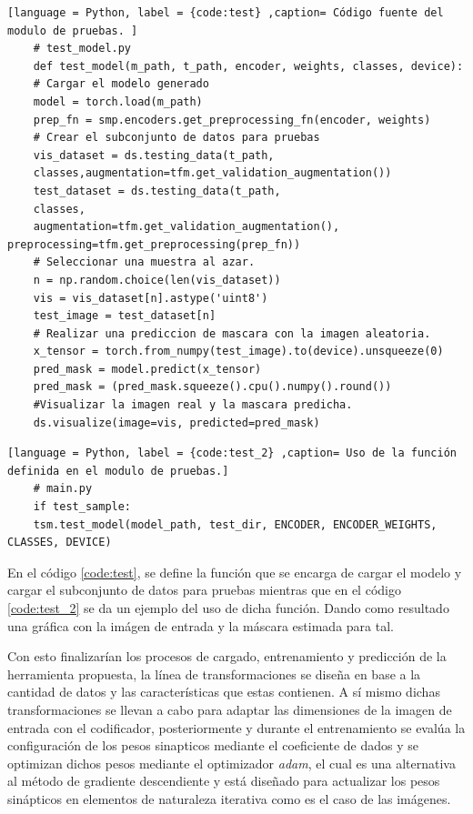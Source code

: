 \begin{lstlisting}[language = Python, label = {code:test} ,caption= Código fuente del modulo de pruebas. ]
    # test_model.py
    def test_model(m_path, t_path, encoder, weights, classes, device):
    # Cargar el modelo generado
    model = torch.load(m_path)
    prep_fn = smp.encoders.get_preprocessing_fn(encoder, weights)
    # Crear el subconjunto de datos para pruebas
    vis_dataset = ds.testing_data(t_path,
    classes,augmentation=tfm.get_validation_augmentation())
    test_dataset = ds.testing_data(t_path,
    classes, 
    augmentation=tfm.get_validation_augmentation(), preprocessing=tfm.get_preprocessing(prep_fn))
    # Seleccionar una muestra al azar.
    n = np.random.choice(len(vis_dataset))
    vis = vis_dataset[n].astype('uint8')
    test_image = test_dataset[n]
    # Realizar una prediccion de mascara con la imagen aleatoria.
    x_tensor = torch.from_numpy(test_image).to(device).unsqueeze(0)
    pred_mask = model.predict(x_tensor)
    pred_mask = (pred_mask.squeeze().cpu().numpy().round())
    #Visualizar la imagen real y la mascara predicha.
    ds.visualize(image=vis, predicted=pred_mask)
\end{lstlisting}

\begin{lstlisting}[language = Python, label = {code:test_2} ,caption= Uso de la función definida en el modulo de pruebas.]
    # main.py
    if test_sample:
    tsm.test_model(model_path, test_dir, ENCODER, ENCODER_WEIGHTS, CLASSES, DEVICE)
\end{lstlisting}

En el código \ref{code:test}, se define la función que se encarga de cargar el modelo y cargar el subconjunto de datos para pruebas mientras que en el código \ref{code:test_2} se da un ejemplo del uso de dicha función. Dando como resultado una gráfica con la imágen de entrada y la máscara estimada para tal.

Con esto finalizarían los procesos de cargado, entrenamiento y predicción de la herramienta propuesta, la línea de transformaciones se diseña en base a la cantidad de datos y las características que estas contienen. A sí mismo dichas transformaciones se llevan a cabo para adaptar las dimensiones de la imagen de entrada con el codificador, posteriormente y durante el entrenamiento se evalúa la configuración de los pesos sinapticos mediante el coeficiente de dados y se optimizan dichos pesos mediante el optimizador \emph{adam}, el cual es una alternativa al método de gradiente descendiente y está diseñado para actualizar los pesos sinápticos en elementos de naturaleza iterativa como es el caso de las imágenes. 




